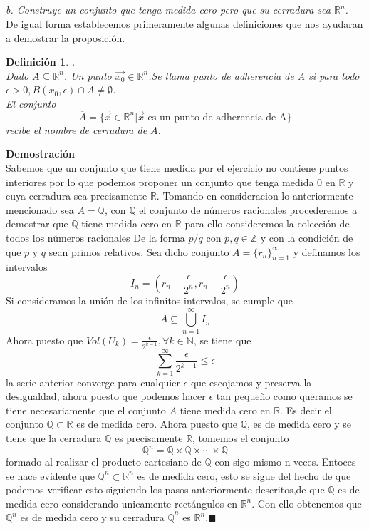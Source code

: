 \documentclass[a4paper,12pt]{article}
\newtheorem{definicion}{Definición}[subsection]
\begin{document}
\subsection{}
\textit{b. Construye un conjunto que tenga medida cero pero que su cerradura sea $\mathbb{R}^n$.\\}
De igual forma establecemos primeramente algunas definiciones que nos ayudaran a demostrar la proposición.
\begin{definicion}.\\
Dado $A \subseteq \mathbb{R}^n$. Un punto $\vec{x_0} \in  \mathbb{R}^n$.Se llama punto de adherencia de A si para todo
$\epsilon > 0, B(x_0,\epsilon) \cap A \not = \emptyset$.\\
El conjunto
\[\overline{A} = \lbrace \vec{x} \in \mathbb{R}^n | \vec{x} \text{ es un punto de adherencia de A} \rbrace\]
recibe el nombre de cerradura de $A$.
\end{definicion}
\textbf{Demostración}\\
Sabemos que un conjunto que tiene medida por el ejercicio no contiene puntos interiores por lo que podemos proponer un
conjunto que tenga medida 0 en $\mathbb{R}$ y cuya cerradura sea precisamente $\mathbb{R}$. Tomando en consideracion lo
anteriormente mencionado sea $A = \mathbb{Q}$, con $\mathbb{Q}$ el conjunto de números racionales procederemos a demostrar
que $\mathbb{Q}$ tiene medida cero en $\mathbb{R}$ para ello consideremos la colección de todos los números racionales De
la forma $p/q$ con $p,q \in \mathbb{Z}$ y con la condición de que $p$ y $q$ sean primos relativos. Sea dicho conjunto
$A = \lbrace r_n\rbrace_{n = 1}^\infty$ y definamos los intervalos
\[I_n = (r_n- \frac{\epsilon}{2^n} , r_n +\frac{\epsilon}{2^n} )\]
Si consideramos la unión de los infinitos intervalos, se cumple que
\[ A \subseteq \bigcup_{n = 1}^\infty I_n \]
Ahora puesto que $Vol(U_k) = \frac{\epsilon}{2^{k-1}}, \forall k \in \mathbb{N}$, se tiene que
\[\sum_{k = 1}^{\infty} \frac{\epsilon}{2^{k-1}} \leq \epsilon \]
la serie anterior converge para cualquier $\epsilon$ que escojamos y preserva la desigualdad, ahora puesto que podemos hacer
$\epsilon$ tan pequeño como queramos se tiene necesariamente que el conjunto $A$ tiene medida cero en $\mathbb{R}$.
Es decir el conjunto $\mathbb{Q} \subset \mathbb{R}$ es de medida cero.
Ahora puesto que $\mathbb{Q}$, es de medida cero y se tiene que la cerradura $\overline{\mathbb{Q}}$ es precisamente
$\mathbb{R}$, tomemos el conjunto
\[\mathbb{Q}^n = \mathbb{Q} \times \mathbb{Q} \times \cdots  \times \mathbb{Q} \]
formado al realizar el producto cartesiano de $\mathbb{Q}$ con sigo mismo n veces. Entoces se hace evidente que
$\mathbb{Q}^n \subset \mathbb{R}^n$ es de medida cero, esto se sigue del hecho de que podemos verificar esto siguiendo los pasos
anteriormente descritos,de que $\mathbb{Q}$ es de medida cero considerando unicamente rectángulos en $\mathbb{R}^n$.
Con ello obtenemos que $\mathbb{Q}^n$ es de medida cero y su cerradura $\overline{\mathbb{Q}}^n$ es $\mathbb{R}^n$.$\blacksquare$
\end{document}
